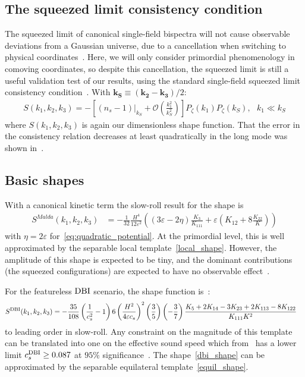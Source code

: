    \subsection{The squeezed limit consistency condition}
The squeezed limit of canonical single-field bispectra will not cause
observable deviations from a Gaussian universe,
due to a cancellation when switching to physical coordinates~\cite{Cabass_2016}.
Here, we will only consider primordial phenomenology
in comoving coordinates, so despite this cancellation,
the squeezed limit is still a useful validation test of our results,
using the standard single-field squeezed limit consistency condition~\cite{sqz_consistency,not_so_sqz}.
With $\mathbf{k_S}\equiv\left(\mathbf{k_2}-\mathbf{k_3}\right)/2 $:
\begin{align}\label{eq:sqz_consistency}
    S(k_1,k_2,k_3) = -\left[(n_s-1)|_{k_S}+\mathcal{O}\left(\frac{k_1^2}{k_S^2}\right)\right]P_{\zeta}(k_1)P_{\zeta}(k_S),
\ \ \  k_1\ll k_S
\end{align}
where $S(k_1,k_2,k_3)$ is again our dimensionless shape function.
That the error in the consistency relation decreases at least quadratically
in the long mode was shown in~\cite{not_so_sqz}.


    \subsection{Basic shapes}
    With a canonical kinetic term
    the slow-roll result for the shape is
\begin{align}\label{malda_shape}
    S^{Malda}(k_1,k_2,k_3) &= -\frac{1}{32}\frac{H^4}{12\varepsilon^2} \left( (3\varepsilon-2\eta)\frac{K_3}{K_{111}}+\varepsilon \left(K_{12}+8\frac{K_{22}}{K}\right) \right)
\end{align}
with $\eta=2\varepsilon$ for~\eqref{eq:quadratic_potential}.
At the primordial level, this is well approximated by the separable local template~\eqref{local_shape}.
However, the amplitude of this shape is expected to be tiny,
and the dominant contributions (the squeezed configurations) are expected
to have no observable effect~\cite{Cabass_2016}.


For the featureless $\text{DBI}$ scenario, the shape function is~\cite{dbi_in_the_sky}:
\begin{align}\label{dbi_shape}
    S^{\text{DBI}}(k_1,k_2,k_3) &= -\frac{35}{108}
         \left(\frac{1}{c_s^2}-1\right)
         6\left(\frac{H^2}{4\varepsilon c_s}\right)^2
         \left(\frac{3}{5}\right)
         \left(-\frac{3}{7}\right)
         \frac{K_5+2K_{14}-3K_{23}+2K_{113}-8K_{122}}{K_{111}K^2}
\end{align}
to leading order in slow-roll.
Any constraint on the magnitude of this template can be translated into one 
on the effective sound speed which from \planck~has a lower limit $c_s^{\text{DBI}} \geq 0.087$
at $95\%$ significance~\cite{Planck_NG_2015}.
The shape~\eqref{dbi_shape} can be approximated by the separable equilateral template~\eqref{equil_shape}.


